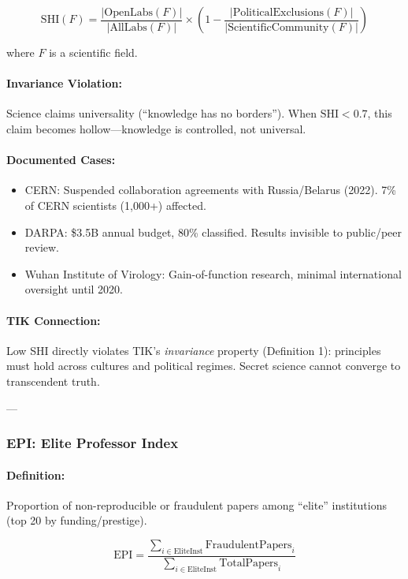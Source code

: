 \documentclass[11pt,a4paper]{article}
\theoremstyle{definition}
\theoremstyle{remark}
\begin{document}
\[
\text{SHI}(F) = \frac{|\text{OpenLabs}(F)|}{|\text{AllLabs}(F)|} \times \left(1 - \frac{|\text{PoliticalExclusions}(F)|}{|\text{ScientificCommunity}(F)|}\right)
\]

where $F$ is a scientific field.

\paragraph{Invariance Violation:}
Science claims universality (``knowledge has no borders''). When $\text{SHI} < 0.7$, this claim becomes hollow—knowledge is controlled, not universal.

\paragraph{Documented Cases:}
\begin{itemize}
\item CERN: Suspended collaboration agreements with Russia/Belarus (2022). 7\% of CERN scientists (1,000+) affected.
\item DARPA: \$3.5B annual budget, 80\% classified. Results invisible to public/peer review.
\item Wuhan Institute of Virology: Gain-of-function research, minimal international oversight until 2020.
\end{itemize}

\paragraph{TIK Connection:}
Low SHI directly violates TIK's \textit{invariance} property (Definition 1): principles must hold across cultures and political regimes. Secret science cannot converge to transcendent truth.

---

\subsubsection{EPI: Elite Professor Index}

\paragraph{Definition:}
Proportion of non-reproducible or fraudulent papers among ``elite'' institutions (top 20 by funding/prestige).

\[
\text{EPI} = \frac{\sum_{i \in \text{EliteInst}} \text{FraudulentPapers}_i}{\sum_{i \in \text{EliteInst}} \text{TotalPapers}_i}
\]
\end{document}

